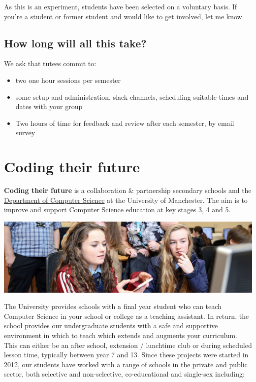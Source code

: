 \documentclass[12pt,]{book}
\providecommand{\tightlist}{%
  \setlength{\itemsep}{0pt}\setlength{\parskip}{0pt}}
\begin{document}
As this is an experiment, students have been selected on a voluntary basis. If you're a student or former student and would like to get involved, let me know.

\hypertarget{how-long-will-all-this-take}{%
\section{How long will all this take?}\label{how-long-will-all-this-take}}

We ask that tutees commit to:

\begin{itemize}
\tightlist
\item
  two one hour sessions per semester
\item
  some setup and administration, slack channels, scheduling suitable times and dates with your group
\item
  Two hours of time for feedback and review after each semester, by email survey
\end{itemize}

\hypertarget{coding-their-future}{%
\chapter{Coding their future}\label{coding-their-future}}

\textbf{Coding their future} is a collaboration \& partnership secondary schools and the \href{https://www.cs.manchester.ac.uk/}{Department of Computer Science} at the University of Manchester. The aim is to improve and support Computer Science education at key stages 3, 4 and 5. \citep{afterthereboot} \citep{shutdownrestart} \citep{cambridgegcse}

\begin{center}\includegraphics[width=1\linewidth]{images/schools-banner} \end{center}

The University provides schools with a final year student who can teach Computer Science in your school or college as a teaching assistant. In return, the school provides our undergraduate students with a safe and supportive environment in which to teach which extends and augments your curriculum. This can either be an after school, extension / lunchtime club or during scheduled lesson time, typically between year 7 and 13. Since these projects were started in 2012, our students have worked with a range of schools in the private and public sector, both selective and non-selective, co-educational and single-sex including:
\end{document}
